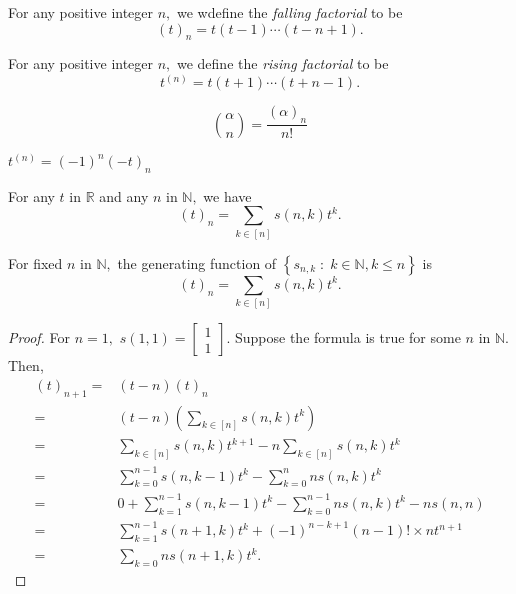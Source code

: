 
\begin{definition}
	For any positive integer $n,$ we wdefine the \emph{falling factorial} to be 
	$$ (t)_n = t(t-1) \cdots (t - n+1).$$
\end{definition}


\begin{definition}
	For any positive integer $n,$ we define the \emph{rising factorial} to be 
	$$ t^{(n)} = t(t+1) \cdots (t + n-1).$$
\end{definition}


\begin{remark}
	$$\binom{ \alpha } {n} = \frac{( \alpha)_n}{n!} $$
\end{remark}

\begin{remark}
	$ t^{(n)} = (-1)^n (-t)_n $
\end{remark}


\begin{theorem}
	For any $t$ in $\mathbb{R}$ and any $n $ in $\mathbb{N},$ we have
	$$(t)_n = \sum_{k \in [n]} s(n,k) t^k. $$
\end{theorem}

\begin{remark}
	For fixed $n$ in $\mathbb{N},$ the generating function of 
	$\left\{ s_{n,k} \;:\; k \in \mathbb{N} , k \leq n \right\} $ is
	$$ (t)_n = \sum_{k \in [n]} s(n,k)t^k. $$
\end{remark}
\begin{proof}
	For $n=1,$ $s(1,1) = 
	\begin{bmatrix} 1\\1 \end{bmatrix}.$
Suppose the formula is true for some $n$ in $\mathbb{N}.$ Then,
\begin{align*}
	(t)_{n+1}
	={}& (t-n) (t)_n \\
	={}& (t-n) \left( \sum_{k \in [n]} s(n,k) t^k \right)  \\
	={}& \sum_{k \in [n]} s(n,k) t^{k+1} - n \sum_{k \in [n]} s(n,k) t^k  \\
	={}& \sum_{k=0}^{n-1} s(n,k-1) t^k - \sum_{k=0}^{n} n s(n,k) t^k\\
	={}& 0 + \sum_{k=1}^{n-1}  s(n,k-1) t^k - \sum_{k=0}^{n-1} n 
	s(n,k) t^k - n s(n,n) \\
	={}& \sum_{k=1}^{n-1} s(n+1,k) t^k + (-1)^{n-k+1} (n-1)! \times n t^{n+1}\\
	={}& \sum_{k=0}{n} s(n+1,k) t^k.
\end{align*}
\end{proof}



